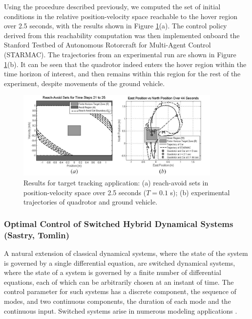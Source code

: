                Using the procedure described previously, we computed
               the set of initial conditions in the relative
               position-velocity space reachable to the hover region
               over 2.5 seconds, with the results shown in Figure
               \ref{fig:target_tracking}(a).  The control policy
               derived from this reachability computation was then
               implemented onboard the Stanford Testbed of Autonomous
               Rotorcraft for Multi-Agent Control (STARMAC).  The
               trajectories from an experimental run are shown in
               Figure \ref{fig:target_tracking}(b).  It can be seen
               that the quadrotor indeed enters the hover region
               within the time horizon of interest, and then remains
               within this region for the rest of the experiment,
               despite movements of the ground vehicle.
               \begin{figure}[thpb]
 	         \centering
	         \includegraphics[width=0.9\textwidth]{img/target-tracking-plots}
	         \caption{Results for target tracking application: (a) reach-avoid sets in position-velocity space over 2.5 seconds ($T = 0.1$ s); (b) experimental trajectories of quadrotor and ground vehicle.}
	         \label{fig:target_tracking}
               \end{figure}



\subsubsection{Optimal Control of Switched Hybrid Dynamical Systems (Sastry, Tomlin)}

A natural extension of classical dynamical systems, where the state of the system is governed by a single differential equation, are switched dynamical systems, where the state of a system is governed by a finite number of differential equations, each of which can be arbitrarily chosen at an instant of time. The control parameter for such systems has a discrete component, the sequence of modes, and two continuous components, the duration of each mode and the continuous input. Switched systems arise in numerous modeling applications \cite{brockett1995stabilization, rantzer_switch}. 

